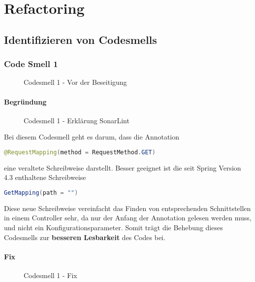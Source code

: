 \chapter{Refactoring}

\section{Identifizieren von Codesmells}

	\subsection{Code Smell 1}
	\begin{figure}[h]
		\centering
		\caption{Codesmell 1 - Vor der Beseitigung}
	\end{figure}

		\subsubsection{Begründung}
		\begin{figure}[h]
			\centering
			\caption{Codesmell 1 - Erklärung SonarLint}
		\end{figure}
		Bei diesem Codesmell geht es darum, dass die Annotation
		\begin{lstlisting}[language=java,gobble=12]
			@RequestMapping(method = RequestMethod.GET)
		\end{lstlisting}
		eine veraltete Schreibweise darstellt. Besser geeignet ist die seit Spring Version 4.3 enthaltene Schreibweise 
		\begin{lstlisting}[language=java,gobble=12]
			GetMapping(path = "")
		\end{lstlisting}
		Diese neue Schreibweise vereinfacht das Finden von entsprechenden Schnittstellen in einem Controller sehr, da nur der Anfang der Annotation gelesen werden muss, und nicht ein Konfigurationsparameter. Somit trägt die Behebung dieses Codesmells zur \textbf{besseren Lesbarkeit} des Codes bei.
		
		\subsubsection{Fix}
		\begin{figure}[h]
			\centering
			\caption{Codesmell 1 - Fix}
		\end{figure}
		
